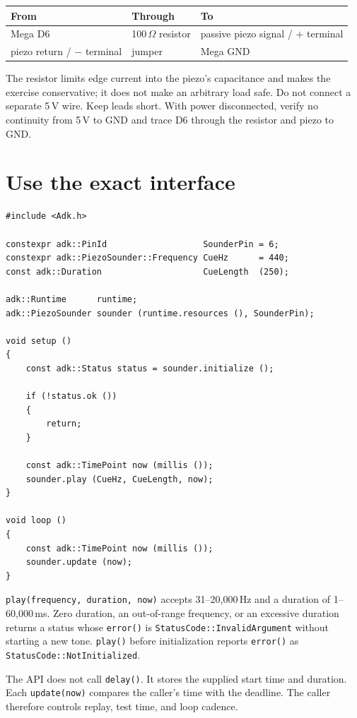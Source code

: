 \documentclass[11pt]{article}
\begin{document}
\begin{center}
\begin{tabular}{@{}lll@{}}
\toprule
From & Through & To\\
\midrule
Mega D6 & 100\,$\Omega$ resistor & passive piezo signal / \(+\) terminal\\
piezo return / \(-\) terminal & jumper & Mega GND\\
\bottomrule
\end{tabular}
\end{center}

The resistor limits edge current into the piezo's capacitance and makes the
exercise conservative; it does not make an arbitrary load safe. Do not connect a
separate 5\,V wire. Keep leads short. With power disconnected, verify no
continuity from 5\,V to GND and trace D6 through the resistor and piezo to GND.

\section{Use the exact interface}

\begin{lstlisting}[style=adkcpp]
#include <Adk.h>

constexpr adk::PinId                   SounderPin = 6;
constexpr adk::PiezoSounder::Frequency CueHz      = 440;
const adk::Duration                    CueLength  (250);

adk::Runtime      runtime;
adk::PiezoSounder sounder (runtime.resources (), SounderPin);

void setup ()
{
    const adk::Status status = sounder.initialize ();

    if (!status.ok ())
    {
        return;
    }

    const adk::TimePoint now (millis ());
    sounder.play (CueHz, CueLength, now);
}

void loop ()
{
    const adk::TimePoint now (millis ());
    sounder.update (now);
}
\end{lstlisting}

\texttt{play(frequency, duration, now)} accepts 31--20,000\,Hz and a duration of
1--60,000\,ms. Zero duration, an out-of-range frequency, or an excessive duration
returns a status whose \texttt{error()} is
\texttt{StatusCode::}\allowbreak\texttt{InvalidArgument} without starting a new
tone.
\texttt{play()} before initialization reports \texttt{error()} as
\texttt{StatusCode::}\allowbreak\texttt{NotInitialized}.

The API does not call \texttt{delay()}. It stores the supplied start time and
duration. Each \texttt{update(now)} compares the caller's time with the deadline.
The caller therefore controls replay, test time, and loop cadence.
\end{document}
